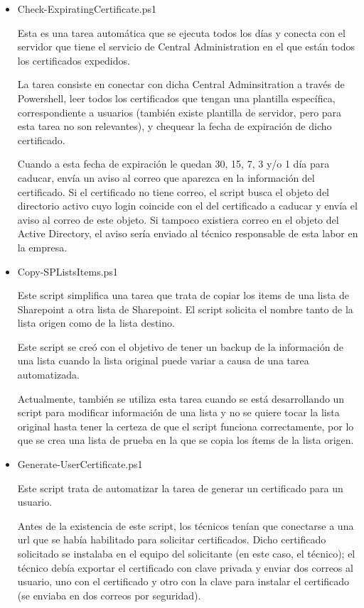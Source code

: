 \documentclass[a4paper, 12pt]{book}
\begin{document}
\begin{itemize}
\item Check-ExpiratingCertificate.ps1

Esta es una tarea automática que se ejecuta todos los días y conecta con el servidor que tiene el servicio de Central Administration en el que están todos los certificados expedidos.

La tarea consiste en conectar con dicha Central Adminsitration a través de Powershell, leer todos los certificados que tengan una plantilla específica, correspondiente a usuarios (también existe plantilla de servidor, pero para esta tarea no son relevantes), y chequear la fecha de expiración de dicho certificado.

Cuando a esta fecha de expiración le quedan 30, 15, 7, 3 y/o 1 día para caducar, envía un aviso al correo que aparezca en la información del certificado. Si el certificado no tiene correo, el script busca el objeto del directorio activo cuyo login coincide con el del certificado a caducar y envía el aviso al correo de este objeto. Si tampoco existiera correo en el objeto del Active Directory, el aviso sería enviado al técnico responsable de esta labor en la empresa.
\\

\item Copy-SPListsItems.ps1

Este script simplifica una tarea que trata de copiar los items de una lista de Sharepoint a otra lista de Sharepoint. El script solicita el nombre tanto de la lista origen como de la lista destino.

Este script se creó con el objetivo de tener un backup de la información de una lista cuando la lista original puede variar a causa de una tarea automatizada. 

Actualmente, también se utiliza esta tarea cuando se está desarrollando un script para modificar información de una lista y no se quiere tocar la lista original hasta tener la certeza de que el script funciona correctamente, por lo que se crea una lista de prueba en la que se copia los ítems de la lista origen.
\\

\item Generate-UserCertificate.ps1

Este script trata de automatizar la tarea de generar un certificado para un usuario. 

Antes de la existencia de este script, los técnicos tenían que conectarse a una url que se había habilitado para solicitar certificados. Dicho certificado solicitado se instalaba en el equipo del solicitante (en este caso, el técnico); el técnico debía exportar el certificado con clave privada y enviar dos correos al usuario, uno con el certificado y otro con la clave para instalar el certificado (se enviaba en dos correos por seguridad).


\end{itemize}
\end{document}
